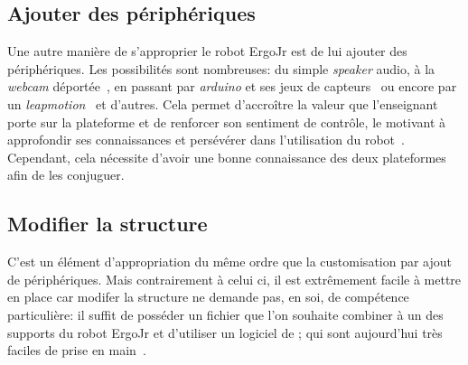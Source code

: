     \subsection{Ajouter des périphériques}
        Une autre manière de s'approprier le robot ErgoJr est de lui ajouter des périphériques. Les possibilités sont nombreuses: du simple \textit{speaker} audio, à la \textit{webcam} déportée~, en passant par \textit{arduino} et ses jeux de capteurs~ ou encore par un \textit{leapmotion}~ et d'autres. Cela permet d'accroître la valeur que l'enseignant porte sur la plateforme et de renforcer son sentiment de contrôle, le motivant à approfondir ses connaissances et persévérer dans l'utilisation du robot~. Cependant, cela nécessite d'avoir une bonne connaissance des deux plateformes afin de les conjuguer.
    \subsection{Modifier la structure}
        C'est un élément d'appropriation du même ordre que la customisation par ajout de périphériques. Mais contrairement à celui ci, il est extrêmement facile à mettre en place car modifer la structure ne demande pas, en soi, de compétence particulière: il suffit de posséder un fichier  que l'on souhaite combiner à un des supports du robot ErgoJr et d'utiliser un logiciel de ; qui sont aujourd'hui très faciles de prise en main~.
